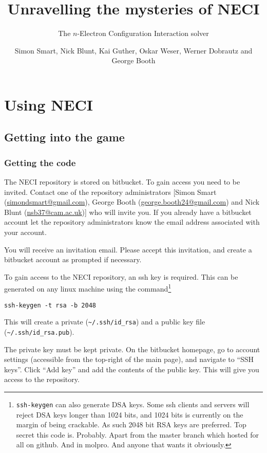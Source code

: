 \documentclass[a4paper,notitlepage,dvipsnames]{scrreprt}
\makeatletter
\let\code\lstinline
\newcommand*{\toccontents}{\@starttoc{toc}}
\makeatother
\begin{document}
\author{Simon Smart, Nick Blunt, Kai Guther, Oskar Weser, Werner Dobrautz and George Booth}
\title{Unravelling the mysteries of NECI}
\subtitle{The $n$-Electron Configuration Interaction solver}
\maketitle

\toccontents

\chapter{Using NECI}
\section{Getting into the game}
\subsection{Getting the code}
	The NECI repository is stored on bitbucket. To gain access you need to be
	invited. Contact one of the repository administrators
	[Simon Smart (\url{simondsmart@gmail.com}), George Booth
	(\url{george.booth24@gmail.com}) and Nick Blunt (\url{nsb37@cam.ac.uk})] who will
	invite you. If you already have a bitbucket account let the repository
	administrators know the email address associated with your account.

	You will receive an invitation email. Please accept this invitation, and
	create a bitbucket account as prompted if necessary.

	To gain access to the NECI repository, an ssh key is required. This can
	be generated on any linux machine using the command\footnote{%
		\code{ssh-keygen} can also generate DSA keys. Some ssh clients and
		servers will reject DSA keys longer than 1024 bits, and 1024 bits is
		currently on the margin of being crackable. As such 2048 bit RSA keys
		are preferred. Top secret this code is. Probably. Apart from the master branch which hosted for all on github. And in molpro.
		And anyone that wants it obviously.
	}
	\begin{lstlisting}[gobble=4]
		ssh-keygen -t rsa -b 2048
	\end{lstlisting}%
	This will create a private (\code{~/.ssh/id_rsa}) and a public key
	file (\code{~/.ssh/id_rsa.pub}).

	The private key must be kept private. On the bitbucket homepage, go to
	account settings (accessible from the top-right	of the main page), and
	navigate to ``SSH keys''. Click ``Add key'' and add the contents of the
	public key. This will give you access to the repository.
\end{document}
